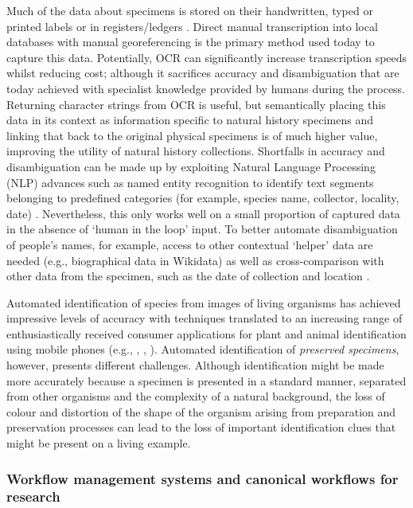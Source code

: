 Much of the data about specimens is stored on their handwritten, typed
or printed labels or in registers/ledgers \cite{Walton 2020b}. Direct manual
transcription into local databases with manual georeferencing is the
primary method used today to capture this data. Potentially, OCR can
significantly increase transcription speeds whilst reducing cost;
although it sacrifices accuracy and disambiguation that are today
achieved with specialist knowledge provided by humans during the
process. Returning character strings from OCR is useful, but
semantically placing this data in its context as information specific to
natural history specimens and linking that back to the original physical
specimens is of much higher value, improving the utility of natural
history collections. Shortfalls in accuracy and disambiguation can be
made up by exploiting Natural Language Processing (NLP) advances such as
named entity recognition to identify text segments belonging to
predefined categories (for example, species name, collector, locality,
date) \cite{Owen 2020}. Nevertheless, this only works well on a small proportion
of captured data in the absence of `human in the loop' input. To better
automate disambiguation of people's names, for example, access to other
contextual `helper' data are needed (e.g., biographical data in
Wikidata) as well as cross-comparison with other data from the specimen,
such as the date of collection and location \cite{Groom 2020}.

Automated identification of species from images of living organisms has
achieved impressive levels of accuracy 
\cite{Knyshov 2021,Hussein 2021,Carranza-Rojas 2017,Little 2020,Pryer 2022,Unger 2016} with techniques
translated to an increasing range of enthusiastically received consumer
applications for plant and animal identification using mobile phones
(e.g., ,
,
).
Automated identification of \emph{preserved specimens}, however,
presents different challenges. Although identification might be made
more accurately because a specimen is presented in a standard manner,
separated from other organisms and the complexity of a natural
background, the loss of colour and distortion of the shape of the
organism arising from preparation and preservation processes can lead to
the loss of important identification clues that might be present on a
living example.

\subsubsection{Workflow management systems and canonical workflows
for
research}\label{ch8:workflow-management-systems-and-canonical-workflows-for-research}

